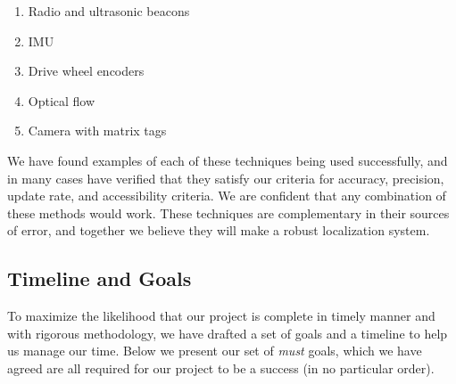 \documentclass{article}
\begin{document}
    \begin{enumerate}
        \item Radio and ultrasonic beacons
        \item IMU
        \item Drive wheel encoders
        \item Optical flow
        \item Camera with matrix tags
    \end{enumerate}

    We have found examples of each of these techniques being used successfully, and in many cases have verified that they satisfy our criteria for accuracy, precision, update rate, and accessibility criteria. We are confident that any combination of these methods would work. These techniques are complementary in their sources of error, and together we believe they will make a robust localization system.

  \subsection{Timeline and Goals}

    To maximize the likelihood that our project is complete in timely manner and with rigorous methodology, we have drafted a set of goals and a timeline to help us manage our time. Below we present our set of \textit{must} goals, which we have agreed are all required for our project to be a success (in no particular order).
\end{document}

